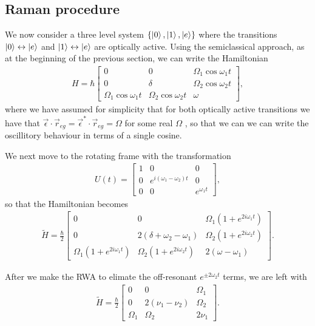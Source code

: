 \subsection{Raman procedure}

We now consider a three level system $\{\left\vert0\right\rangle, \left\vert1\right\rangle, \left\vert e\right\rangle\}$ where the transitions $\left\vert0\right\rangle \leftrightarrow \left\vert e\right\rangle$ and $\left\vert1\right\rangle \leftrightarrow \left\vert e\right\rangle$ are optically active. Using the semiclassical approach, as at the beginning of the previous section, we can write the Hamiltonian
\begin{align}
  H=\hbar
  \begin{bmatrix}
    0 & 0 & \Omega_1 \cos\omega_1 t \\
    0 & \delta & \Omega_2 \cos\omega_2 t \\
    \Omega_1 \cos\omega_1 t & \Omega_2 \cos\omega_2 t & \omega
  \end{bmatrix},
\end{align}
where we have assumed for simplicity that for both optically active transitions we have that $\vec{\epsilon}\cdot \vec{r}_{eg} = \vec{\epsilon}^*\cdot \vec{r}_{eg} = \Omega$ for some real $\Omega$ , so that we can we can write the oscillitory behaviour in terms of a single cosine.

We next move to the rotating frame with the transformation
\begin{align}
  U(t) = 
  \begin{bmatrix}
    1 & 0 & 0 \\
    0 & e^{i(\omega_1 - \omega_2)t} & 0 \\
    0 & 0 & e^{\omega_1 t}
  \end{bmatrix},
\end{align}
so that the Hamiltonian becomes
\begin{align}
  \tilde{H}=\frac{\hbar}{2}
  \begin{bmatrix}
    0 & 0 & \Omega_1(1+e^{2i\omega_1 t}) \\
    0 & 2(\delta + \omega_2 - \omega_1) & \Omega_2 (1+e^{2i\omega_2 t}) \\
    \Omega_1(1+e^{2i\omega_1 t}) & \Omega_2 (1+e^{2i\omega_2 t}) & 2(\omega - \omega_1)
  \end{bmatrix}.
\end{align}

After we make the RWA to elimate the off-resonant $e^{\pm2\omega_2 t}$ terms, we are left with 
\begin{align}
  \tilde{H}=\frac{\hbar}{2}
  \begin{bmatrix}
    0 & 0 & \Omega_1 \\
    0 & 2(\nu_1 - \nu_2) & \Omega_2  \\
    \Omega_1 & \Omega_2  & 2\nu_1
  \end{bmatrix}.
\end{align}

